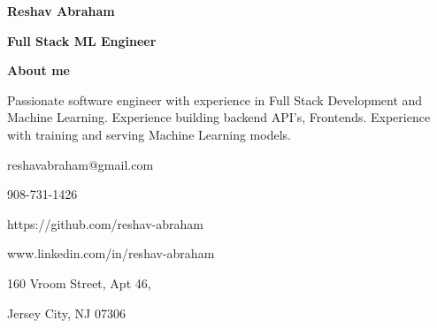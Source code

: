 \documentclass{article}
\begin{document}
\begin{minipage}[t][0pt]{8in\linewidth}
    \begin{minipage}[t]{5.5in\linewidth}
    \Huge\vspace{0in}\hspace{-0.30em}\textbf{Reshav Abraham}  

    \vspace{0em}\hspace{-0.2em}\Large\textbf{Full Stack ML Engineer} 

    \vspace{0.5em}\hspace{0em}\small\textbf{About me} 

        \begin{minipage}[t]{0.6\textwidth\hspace{0em}}
            Passionate software engineer with experience in Full Stack Development and Machine Learning. Experience building backend API’s, Frontends. Experience with training and serving Machine Learning models. \par
        \end{minipage}
    \end{minipage}
    \begin{minipage}[t]{17em\linewidth\hspace{-4em}}
        
        \vspace{2.75em}
        \faEnvelopeO\hspace{0.4em}\small\mdseries\textrm{reshavabraham@gmail.com}

        \vspace{0.2em}
        \faPhone\hspace{0.65em}\small\mdseries\textrm{908-731-1426}
        
        \vspace{0.2em}
        \faGithub\hspace{0.6em}\small\mdseries\textrm{https://github.com/reshav-abraham}
        
        \vspace{0.2em}
        \faLinkedin\hspace{0.6em}\small\mdseries\textrm{www.linkedin.com/in/reshav-abraham}
        
        \vspace{0.2em}
        \faHome\hspace{0.4em}\small\mdseries\textrm{160 Vroom Street, Apt 46,} 
        
        \hspace{1.25em}\small\mdseries\textrm{Jersey City, NJ 07306}
    \end{minipage}


\end{minipage}
\end{document}
